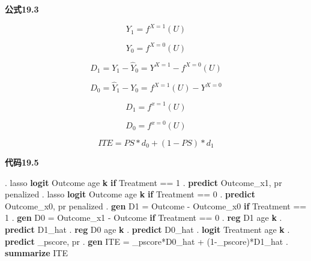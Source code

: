 \documentclass[
  chinese-hans,
  letterpaper,
  DIV=11,
  numbers=noendperiod]{scrreprt}
\newenvironment{Shaded}{\begin{snugshade}}{\end{snugshade}}
\newcommand{\KeywordTok}[1]{\textcolor[rgb]{0.00,0.23,0.31}{\textbf{#1}}}
\newcommand{\NormalTok}[1]{\textcolor[rgb]{0.00,0.23,0.31}{#1}}
\begin{document}
\textbf{公式19.3}

\[
Y_1=f^{X=1}(U)
\]

\[
Y_0=f^{X=0}(U)
\]

\[
D_1=Y_1-\widehat{Y}_0=Y^{X=1}-f^{X=0}(U)
\]

\[
D_0=\widehat{Y}_1-Y_0=f^{X=1}(U)-Y^{X=0}
\]

\[
D_1=f^{x=1}(U)
\]

\[
D_0=f^{x=0}(U)
\]

\[
ITE=PS*d_0+(1-PS)*d_1
\]

\begin{tcolorbox}[enhanced jigsaw, arc=.35mm, bottomrule=.15mm, breakable, colback=white, colframe=quarto-callout-note-color-frame, left=2mm, leftrule=.75mm, opacityback=0, rightrule=.15mm, toprule=.15mm]

\vspace{-3mm}\textbf{代码19.5}\vspace{3mm}

\begin{Shaded}
\begin{Highlighting}[]
\NormalTok{. lasso }\KeywordTok{logit}\NormalTok{ Outcome age }\KeywordTok{k} \KeywordTok{if}\NormalTok{ Treatment == 1}
\NormalTok{. }\KeywordTok{predict}\NormalTok{ Outcome\_x1, pr penalized}
\NormalTok{. lasso }\KeywordTok{logit}\NormalTok{ Outcome age }\KeywordTok{k} \KeywordTok{if}\NormalTok{ Treatment == 0}
\NormalTok{. }\KeywordTok{predict}\NormalTok{ Outcome\_x0, pr penalized}
\NormalTok{. }\KeywordTok{gen}\NormalTok{ D1 = Outcome {-} Outcome\_x0 }\KeywordTok{if}\NormalTok{ Treatment == 1}
\NormalTok{. }\KeywordTok{gen}\NormalTok{ D0 = Outcome\_x1 {-} Outcome }\KeywordTok{if}\NormalTok{ Treatment == 0}
\NormalTok{. }\KeywordTok{reg}\NormalTok{ D1 age }\KeywordTok{k}
\NormalTok{. }\KeywordTok{predict}\NormalTok{ D1\_hat}
\NormalTok{. }\KeywordTok{reg}\NormalTok{ D0 age }\KeywordTok{k}
\NormalTok{. }\KeywordTok{predict}\NormalTok{ D0\_hat}
\NormalTok{. }\KeywordTok{logit}\NormalTok{ Treatment age }\KeywordTok{k}
\NormalTok{. }\KeywordTok{predict}\NormalTok{ \_pscore, pr}
\NormalTok{. }\KeywordTok{gen}\NormalTok{ ITE = \_pscore*D0\_hat + (1{-}\_pscore)*D1\_hat}
\NormalTok{. }\KeywordTok{summarize}\NormalTok{ ITE}
\end{Highlighting}
\end{Shaded}

\end{tcolorbox}
\end{document}
